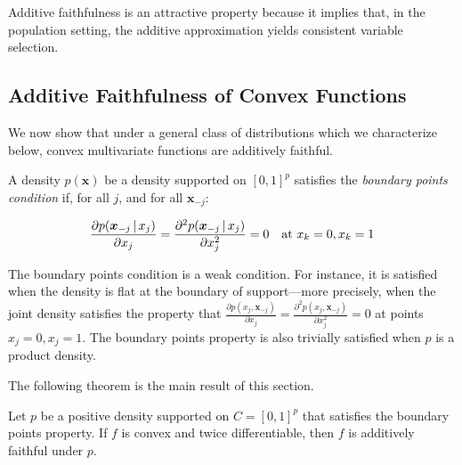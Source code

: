 
Additive faithfulness is an attractive property because it implies
that, in the population setting, the additive approximation yields
consistent variable selection.

\subsection{Additive Faithfulness of Convex Functions}

We now show that under a general class of distributions which we
characterize below, convex multivariate functions are additively
faithful.

\begin{definition}
\label{defn:boundary-point}
A density $p(\mathbf{x})$ be a density supported on $[0,1]^p$ satisfies
the \emph{boundary points condition} if, for all $j$, and for all $\mathbf{x}_{-j}$:

\begin{equation}
\frac{\partial p(\mbox{\boldmath $x$}_{-j} {\,|\,} x_j)}{\partial x_j}  =  
\frac{\partial^2 p(\mbox{\boldmath $x$}_{-j} {\,|\,} x_j)}{\partial x_j^2} = 0
\quad \textrm{at } x_k = 0, x_k = 1
\end{equation}

\end{definition}



The boundary points condition is a weak condition. For instance, it is
satisfied when the density is flat at the boundary of support---more
precisely, when the joint density satisfies the property that
$\frac{\partial p(x_j,\mathbf{x}_{-j})}{\partial x_j} =
\frac{\partial^2 p(x_j, \mathbf{x}_{-j})}{\partial x_j^2} = 0$ at
points $x_j = 0, x_j=1$. The boundary points property is also
trivially satisfied when $p$ is a product density.

The following theorem is the main result of this section.

\begin{theorem}
\label{thm:convex_faithful}
Let $p$ be a positive density supported on $C=[0,1]^p$ that satisfies
the boundary points property. 
If $f$ is convex and twice differentiable, then $f$ is additively faithful under $p$.
\end{theorem}


